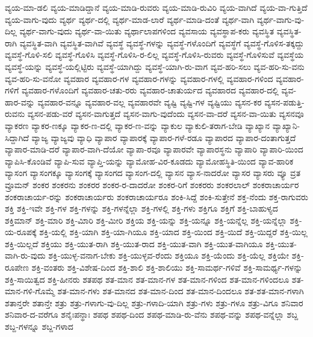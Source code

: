 {ವ್ಯಯ-ಮಾ-ಡಲಿ
ವ್ಯಯ-ಮಾಡಿದ್ದಾನೆ
ವ್ಯಯ-ಮಾಡಿ-ರುವರು
ವ್ಯಯ-ಮಾಡಿ-ರುವಿರಿ
ವ್ಯಯ-ವಾಗಿದೆ
ವ್ಯಯ-ವಾ-ಗುತ್ತಿದೆ
ವ್ಯಯ-ವಾಗು-ವುದು
ವ್ಯರ್ಥ
ವ್ಯರ್ಥ-ದಲ್ಲಿ
ವ್ಯರ್ಥ-ಮಾಡ-ಲಾರೆ
ವ್ಯರ್ಥ-ಮಾಡಿ-ದಂತೆ
ವ್ಯರ್ಥ-ವಾಗಿ
ವ್ಯರ್ಥ-ವಾಗು-ವು-ದಿಲ್ಲ
ವ್ಯರ್ಥ-ವಾಗು-ವುದು
ವ್ಯರ್ಥ-ವಾ-ಯಿತು
ವ್ಯರ್ಥಾಲಾಪಗಳಿಂದ
ವ್ಯವಸಾಯ
ವ್ಯವಸ್ಥಾಪ-ಕರು
ವ್ಯವಸ್ಥಿತ
ವ್ಯವಸ್ಥಿತ-ರಾಗಿ
ವ್ಯವಸ್ಥಿತ-ವಾಗಿ
ವ್ಯವಸ್ಥಿತ-ವಾಗಿವೆ
ವ್ಯವಸ್ಥೆ
ವ್ಯವಸ್ಥೆ-ಗಳನ್ನು
ವ್ಯವಸ್ಥೆ-ಗಳೊಂದಿಗೆ
ವ್ಯವಸ್ಥೆಗೆ
ವ್ಯವಸ್ಥೆ-ಗೊಳಿಸ-ತಕ್ಕದ್ದು
ವ್ಯವಸ್ಥೆ-ಗೊಳಿ-ಸಲಿ
ವ್ಯವಸ್ಥೆ-ಗೊಳಿಸಿ
ವ್ಯವಸ್ಥೆ-ಗೊಳಿಸಿ-ರ-ಲಿಲ್ಲ
ವ್ಯವಸ್ಥೆ-ಗೊಳಿಸಿ-ರುವರು
ವ್ಯವಸ್ಥೆ-ಗೊಳಿಸುವೆ
ವ್ಯವಸ್ಥೆಯ
ವ್ಯವಸ್ಥೆ-ಯನ್ನು
ವ್ಯವಸ್ಥೆ-ಯಲ್ಲಿಟ್ಟಿರು
ವ್ಯವಸ್ಥೆ-ಯಾಗಿದ್ದು
ವ್ಯವಸ್ಥೆ-ಯಾಗಿ-ರು-ವಾಗ
ವ್ಯವ-ಹರಿ-ಸಲು
ವ್ಯವ-ಹರಿ-ಸು-ವನು
ವ್ಯವ-ಹರಿ-ಸು-ವನೋ
ವ್ಯವಹಾರ
ವ್ಯವಹಾರ-ಗಳ
ವ್ಯವಹಾರ-ಗಳನ್ನು
ವ್ಯವಹಾರ-ಗಳಲ್ಲಿ
ವ್ಯವಹಾರ-ಗಳಿಂದ
ವ್ಯವಹಾರ-ಗಳಿಗೆ
ವ್ಯವಹಾರ-ಗಳೊಂದಿಗೆ
ವ್ಯವಹಾರ-ಚತು-ರರು
ವ್ಯವಹಾರ-ಚಾತುರ್ಯದ
ವ್ಯವಹಾರದ
ವ್ಯವಹಾರ-ದಲ್ಲಿ
ವ್ಯವ-ಹಾರ-ವನ್ನು
ವ್ಯವಹಾರ-ವನ್ನೂ
ವ್ಯವಹಾರ-ವಲ್ಲ
ವ್ಯವಹಾರವೇ
ವ್ಯಷ್ಟಿ
ವ್ಯಷ್ಟಿ-ಗಳ
ವ್ಯಷ್ಟಿಯು
ವ್ಯಸನ-ಕರ
ವ್ಯಸನ-ಪಡುತ್ತಿ-ರುವನು
ವ್ಯಸನ-ಪಡು-ವರೆ
ವ್ಯಸನ-ವಾಗುತ್ತದೆ
ವ್ಯಸನ-ವಾಗು-ವುದೆಂದು
ವ್ಯಸನ-ವಾ-ದರೆ
ವ್ಯಸನ-ವಾ-ಯಿತು
ವ್ಯಸನವೂ
ವ್ಯಾಕರಣ
ವ್ಯಾಕರ-ಣಕ್ಕೂ
ವ್ಯಾಕರ-ಣ-ದಲ್ಲಿ
ವ್ಯಾಕರ-ಣ-ವನ್ನು
ವ್ಯಾಕುಲ
ವ್ಯಾಕುಲಿ-ತರಾಗ-ಬೇಡಿ
ವ್ಯಾಖ್ಯಾನ
ವ್ಯಾಖ್ಯಾನಿ-ಸಿದ್ದಾಗಿದೆ
ವ್ಯಾಜ್ಯ
ವ್ಯಾಜ್ಯವು
ವ್ಯಾಧಿ
ವ್ಯಾಪಾರ
ವ್ಯಾಪಾರಕ್ಕೆ
ವ್ಯಾಪಾರ-ಗಳೆ-ರಡೂ
ವ್ಯಾಪಾರದ
ವ್ಯಾಪಾರ-ದಂತಾಗುತ್ತದೆ
ವ್ಯಾಪಾರ-ಮಾಡಿ-ದರೆ
ವ್ಯಾಪಾರ-ವಾಗಿ-ದೆಯೋ
ವ್ಯಾಪಾ-ರವೂ
ವ್ಯಾಪಾರವೇ
ವ್ಯಾಪಾರಸ್ಥನು
ವ್ಯಾಪಾರಿ
ವ್ಯಾಪಾರಿ-ಯಿಂದ
ವ್ಯಾಪಿಸಿ-ಕೊಂಡಿವೆ
ವ್ಯಾಪಿ-ಸುವ
ವ್ಯಾಪ್ತಿ-ಯನ್ನು
ವ್ಯಾಮೋಹ-ವಿರ-ಕೂಡದು
ವ್ಯಾಮೋಹಸ್ಥಿತಿ-ಯಿಂದ
ವ್ಯಾವ-ಹಾರಿಕ
ವ್ಯಾಸಂಗ
ವ್ಯಾಸಂಗಕ್ಕೂ
ವ್ಯಾಸಂಗಕ್ಕೆ
ವ್ಯಾಸಂಗದ
ವ್ಯಾಸಂಗ-ದಲ್ಲಿ
ವ್ಯಾಸನ
ವ್ಯಾಸ-ನಾದರೋ
ವ್ಯಾಸರ
ವ್ಯಾಸರು
ವ್ಯೂ
ವ್ರತ
ವ್ರೂಮನ್
ಶಂಕರ
ಶಂಕರನು
ಶಂಕರರ
ಶಂಕರ-ರ-ದಾದರೋ
ಶಂಕರ-ರಿಗೆ
ಶಂಕರರು
ಶಂಕರಲಾಲ್
ಶಂಕರಾಚಾರ್ಯರ
ಶಂಕರಾಚಾರ್ಯ-ರನ್ನು
ಶಂಕರಾಚಾರ್ಯರು
ಶಂಕರಾಚಾರ್ಯರೂ
ಶಂಕಿ-ಸಿದ್ದೆ
ಶಂಕಿ-ಸುತ್ತೇನೆ
ಶಕ್ತ-ನೆಂದು
ಶಕ್ತ-ರಾಗುವರು
ಶಕ್ತಿ
ಶಕ್ತಿ-ಇವೇ
ಶಕ್ತಿ-ಗಳ
ಶಕ್ತಿ-ಗಳನ್ನು
ಶಕ್ತಿ-ಗಳನ್ನೆಲ್ಲಾ
ಶಕ್ತಿ-ಗಳಲ್ಲಿ
ಶಕ್ತಿ-ಗಳು
ಶಕ್ತಿಗೂ
ಶಕ್ತಿಗೆ
ಶಕ್ತಿ-ಬಾಹುಳ್ಯದ
ಶಕ್ತಿಮಾನ್
ಶಕ್ತಿ-ಮಾರಿ
ಶಕ್ತಿ-ಮಿಾರಿ
ಶಕ್ತಿ-ಮೀರಿ
ಶಕ್ತಿಯ
ಶಕ್ತಿ-ಯನ್ನು
ಶಕ್ತಿ-ಯನ್ನೂ
ಶಕ್ತಿ-ಯನ್ನೆಲ್ಲ
ಶಕ್ತಿ-ಯನ್ನೆಲ್ಲಾ
ಶಕ್ತಿ-ಯ-ರೂಪಕ್ಕೆ
ಶಕ್ತಿ-ಯಲ್ಲಿ
ಶಕ್ತಿ-ಯಾಗಿ
ಶಕ್ತಿ-ಯಾ-ಗಿಯೂ
ಶಕ್ತಿ-ಯಾದ
ಶಕ್ತಿ-ಯಿಂದ
ಶಕ್ತಿ-ಯಿದೆ
ಶಕ್ತಿ-ಯಿದ್ದರೆ
ಶಕ್ತಿ-ಯಿಲ್ಲ
ಶಕ್ತಿ-ಯಿಲ್ಲದೆ
ಶಕ್ತಿಯು
ಶಕ್ತಿ-ಯುತ-ರಾಗಿ
ಶಕ್ತಿ-ಯುತ-ರಾದ
ಶಕ್ತಿ-ಯುತ-ವಾಗಿ
ಶಕ್ತಿ-ಯುತ-ವಾಗಿಯೂ
ಶಕ್ತಿ-ಯುತ-ವಾಗಿ-ರು-ವುದು
ಶಕ್ತಿ-ಯುಳ್ಳ-ವನಾಗ-ಬೇಕು
ಶಕ್ತಿ-ಯುಳ್ಳವ-ರೆಂದು
ಶಕ್ತಿಯೂ
ಶಕ್ತಿ-ಯೆಂದು
ಶಕ್ತಿ-ಯೆಲ್ಲ
ಶಕ್ತಿಯೇ
ಶಕ್ತಿ-ರೂಪೇಣ
ಶಕ್ತಿ-ವಂತರು
ಶಕ್ತಿ-ವಿಶೇಷ-ದಿಂದ
ಶಕ್ತಿ-ಶಾಲಿ
ಶಕ್ತಿ-ಶಾಲಿಯು
ಶಕ್ತಿ-ಸಾಮರ್ಥ-ಗಳಿವೆ
ಶಕ್ತಿ-ಸಾಮರ್ಥ್ಯ-ಗಳನ್ನು
ಶಕ್ತಿ-ಸಾಯಿತ್ವದ
ಶಕ್ತಿ-ಹೀನರು
ಶತಪಥ
ಶತ-ಮಾನ
ಶತ-ಮಾನ-ಗಳ
ಶತ-ಮಾನ-ಗಳಿಂದ
ಶತ-ಮಾನ-ಗಳಿಂದಲೂ
ಶತ-ಮಾನ-ಗಳಿ-ಗೊಮ್ಮೆ
ಶತ-ಮಾನ-ಗಳು
ಶತ-ಮಾನದ
ಶತ-ಮಾನ-ದಿಂದ
ಶತ-ಮಾನ-ದಿಂದಲೂ
ಶತ-ಶತ-ಮಾನ-ಗಳಾಗಿ
ಶತಾನ್ತರೇ
ಶತಾನ್ತೇ
ಶತ್ರು
ಶತ್ರು-ಗಳಾಗು-ವು-ದಿಲ್ಲ
ಶತ್ರು-ಗಳಾದಿ-ಯಾಗಿ
ಶತ್ರು-ಗಳು
ಶತ್ರು-ಗಳೂ
ಶತ್ರು-ವಿಗೂ
ಶನಿವಾರ
ಶನಿವಾರ-ದ-ವರೆಗೂ
ಶನೈಃಪನ್ಥಾಃ
ಶಪಥ
ಶಪಥ-ದಿಂದ
ಶಪಥ-ಮಾಡಿ-ರು-ವೆನು
ಶಪಥ-ವನ್ನು
ಶಪಥ-ವನ್ನೆಲ್ಲಾ
ಶಬ್ದ
ಶಬ್ದ-ಗಳನ್ನೂ
ಶಬ್ದ-ಗಳಾದ
}
